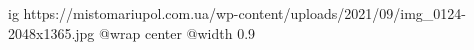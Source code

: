  
 
 
 
 

\ifcmt
  ig https://mistomariupol.com.ua/wp-content/uploads/2021/09/img_0124-2048x1365.jpg
  @wrap center
  @width 0.9
\fi
